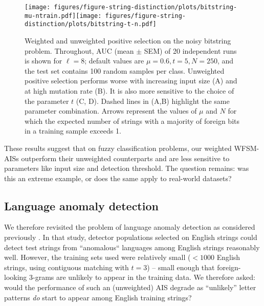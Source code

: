 \documentclass{llncs}
\begin{document}
\begin{figure}[h]
  \centering
   \texttt{[image: figures/figure-string-distinction/plots/bitstring-mu-ntrain.pdf]}\texttt{[image: figures/figure-string-distinction/plots/bitstring-t-n.pdf]}

   \caption{
	Weighted and unweighted positive selection on the noisy bitstring problem. Throughout, AUC 
	(mean $\pm$ SEM) of 20 independent runs is shown for $\ell=8$; default values 
	are $\mu=0.6, t=5, N=250$, and the test set contains 100 random samples per class.
	Unweighted positive selection performs worse with increasing input size (A) and
	at high mutation rate (B). It is also more sensitive to the choice of the parameter 
	$t$ (C, D). Dashed lines in (A,B) highlight the same parameter combination.
	Arrows represent the values of $\mu$ and $N$ for which the expected number of strings 
	with a majority of foreign bits in a training  sample exceeds 1. 
  }
  \label{figurestringdistinction}
\end{figure}


These results suggest that on fuzzy classification problems, our weighted 
WFSM-AISs outperform their unweighted counterparts and are less sensitive
to parameters like input size and detection threshold. The question remains: was this
an extreme example, or does the same apply to real-world datasets?

\subsection{Language anomaly detection}

We therefore revisited the problem of language anomaly detection as 
considered previously \cite{Wortel2020t}. In that study, detector populations 
selected on English strings could detect test strings from ``anomalous`` 
languages among English strings reasonably well. However, the training sets used were relatively 
small ($< 1000$ English strings, using contiguous matching with $t=3$) -- small enough 
that foreign-looking 3-grams are unlikely to appear in the training data. We therefore 
asked: would the performance 
of such an (unweighted) AIS degrade as ``unlikely'' letter patterns \emph{do} start to appear
among English training strings?
\end{document}
